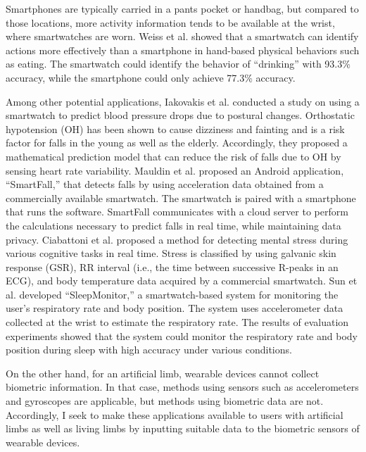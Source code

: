 Smartphones are typically carried in a pants pocket or handbag, but compared to those locations, more activity information tends to be available at the wrist, where smartwatches are worn. Weiss et al. \cite{smartwatch_activity_recognition} showed that a smartwatch can identify actions more effectively than a smartphone in hand-based physical behaviors such as eating. The smartwatch could identify the behavior of ``drinking'' with 93.3\% accuracy, while the smartphone could only achieve 77.3\% accuracy.\par

Among other potential applications, Iakovakis et al. \cite{oh_detection} conducted a study on using a smartwatch to predict blood pressure drops due to postural changes. Orthostatic hypotension (OH) has been shown to cause dizziness and fainting and is a risk factor for falls in the young as well as the elderly. Accordingly, they proposed a mathematical prediction model that can reduce the risk of falls due to OH by sensing heart rate variability. Mauldin et al. \cite{smartfall} proposed an Android application, ``SmartFall,'' that detects falls by using acceleration data obtained from a commercially available smartwatch. The smartwatch is paired with a smartphone that runs the software. SmartFall communicates with a cloud server to perform the calculations necessary to predict falls in real time, while maintaining data privacy. Ciabattoni et al. \cite{smartwatch_stress_detection} proposed a method for detecting mental stress during various cognitive tasks in real time. Stress is classified by using galvanic skin response (GSR), RR interval (i.e., the time between successive R-peaks in an ECG), and body temperature data acquired by a commercial smartwatch. Sun et al. \cite{SleepMonitor} developed ``SleepMonitor,'' a smartwatch-based system for monitoring the user's respiratory rate and body position. The system uses accelerometer data collected at the wrist to estimate the respiratory rate. The results of evaluation experiments showed that the system could monitor the respiratory rate and body position during sleep with high accuracy under various conditions.\par

On the other hand, for an artificial limb, wearable devices cannot collect biometric information. In that case, methods using sensors such as accelerometers and gyroscopes are applicable, but methods using biometric data are not. Accordingly, I seek to make these applications available to users with artificial limbs as well as living limbs by inputting suitable data to the biometric sensors of wearable devices.


